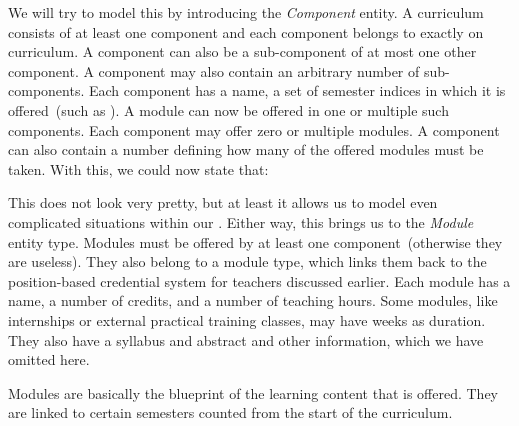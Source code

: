 We will try to model this by introducing the \emph{Component} entity.
A curriculum consists of at least one component and each component belongs to exactly on curriculum.
A component can also be a sub-component of at most one other component.
A component may also contain an arbitrary number of sub-components.
Each component has a name, a set of semester indices in which it is offered~(such as ).
A module can now be offered in one or multiple such components.
Each component may offer zero or multiple modules.
A component can also contain a number defining how many of the offered modules must be taken.
With this, we could now state that:

\emph{}

This does not look very pretty, but at least it allows us to model even complicated situations within our \db.
Either way, this brings us to the \emph{Module} entity type.
Modules must be offered by at least one component~(otherwise they are useless).
They also belong to a module type, which links them back to the position-based credential system for teachers discussed earlier.
Each module has a name, a number of credits, and a number of teaching hours.
Some modules, like internships or external practical training classes, may have weeks as duration.
They also have a syllabus and abstract and other information, which we have omitted here.

Modules are basically the blueprint of the learning content that is offered.
They are linked to certain semesters counted from the start of the curriculum.

